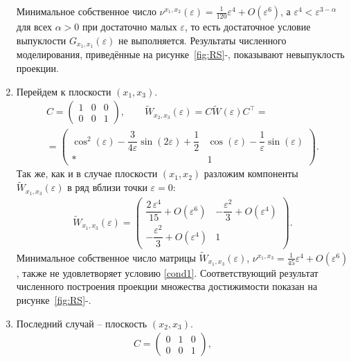 \documentclass[../main.tex]{subfiles}
\begin{document}
\begin{enumerate}
		Минимальное собственное число $ \nu^{x_1,x_2}(\varepsilon) = \frac{1}{120}\varepsilon^4 + O(\varepsilon^6)$, а $ \varepsilon^4 < \varepsilon^{3-\alpha} $ для всех $ \alpha > 0 $ при достаточно малых $ \varepsilon $, то есть достаточное условие выпуклости $ G_{x_1, x_1}(\varepsilon) $ не выполняется. Результаты численного моделирования, приведённые на рисунке~\ref{fig:RS}-, показывают невыпуклость проекции. 
		\item Перейдем к плоскости $ (x_1,x_3) $. 
		\begin{gather*}
			C = \begin{pmatrix}
				1 & 0 & 0 \\
				0 & 0 & 1
			\end{pmatrix}, \qquad
			\widetilde{W}_{x_2,x_3}(\varepsilon) =  C \widetilde{W} (\varepsilon) C^{\top}  = \\ =\begin{pmatrix}
				\cos^2(\varepsilon)-\dfrac{3}{4\varepsilon}\sin(2\varepsilon)+\dfrac{1}{2} & 
				\cos\left(\varepsilon \right)-\dfrac{1}{\varepsilon} \sin\left(\varepsilon \right) \\ 
				* & 1
			\end{pmatrix}.
		\end{gather*}
		Так же, как и в случае плоскости $ (x_1,x_2) $ разложим компоненты $ 	\widetilde{W}_{x_1,x_3}(\varepsilon)  $ в ряд вблизи точки $ \varepsilon = 0 $:
		\begin{gather*}
			\widetilde{W}_{x_1,x_3}(\varepsilon) = \begin{pmatrix} 
				\dfrac{2\,\varepsilon ^4}{15} + O(\varepsilon^6) &
				-\dfrac{\varepsilon^2}{3}+ O(\varepsilon ^4)\\[8pt]
				-\dfrac{\varepsilon^2}{3} + O(\varepsilon^4) & 1 \end{pmatrix}.
		\end{gather*}
		Минимальное собственное число матрицы $  \widetilde{W}_{x_1,x_3}(\varepsilon)  $, $ \nu^{x_1,x_3} =   \frac{1}{45}\varepsilon^4 + O(\varepsilon^6) $, также не удовлетворяет условию \eqref{cond1}. Соответствующий результат численного построения проекции множества достижимости показан на рисунке~\ref{fig:RS}-.
		\item Последний случай -- плоскость $ (x_2,x_3) $.
		\begin{gather*}
			C = \begin{pmatrix}
				0 & 1 & 0 \\
				0 & 0 & 1
			\end{pmatrix}, \qquad

\end{gather*}
\end{enumerate}
\end{document}
